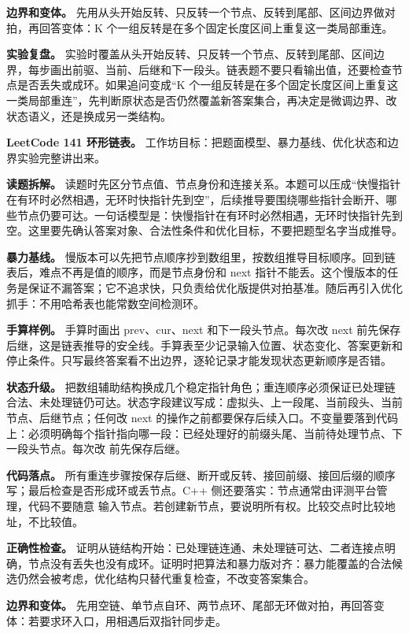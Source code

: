 \textbf{边界和变体。} 先用从头开始反转、只反转一个节点、反转到尾部、区间边界做对拍，再回答变体：K 个一组反转是在多个固定长度区间上重复这一类局部重连。

\textbf{实验复盘。} 实验时覆盖从头开始反转、只反转一个节点、反转到尾部、区间边界，每步画出前驱、当前、后继和下一段头。链表题不要只看输出值，还要检查节点是否丢失或成环。如果追问变成“K 个一组反转是在多个固定长度区间上重复这一类局部重连”，先判断原状态是否仍然覆盖新答案集合，再决定是微调边界、改状态语义，还是换成另一类结构。

\noindent\textbf{LeetCode 141 环形链表。} 工作坊目标：把题面模型、暴力基线、优化状态和边界实验完整讲出来。

\textbf{读题拆解。} 读题时先区分节点值、节点身份和连接关系。本题可以压成“快慢指针在有环时必然相遇，无环时快指针先到空”，后续推导要围绕哪些指针会断开、哪些节点仍要可达。一句话模型是：快慢指针在有环时必然相遇，无环时快指针先到空。这里要先确认答案对象、合法性条件和优化目标，不要把题型名字当成推导。

\textbf{暴力基线。} 慢版本可以先把节点顺序抄到数组里，按数组推导目标顺序。回到链表后，难点不再是值的顺序，而是节点身份和 next 指针不能丢。这个慢版本的任务是保证不漏答案；它不追求快，只负责给优化版提供对拍基准。随后再引入优化抓手：不用哈希表也能常数空间检测环。

\textbf{手算样例。} 手算时画出 prev、cur、next 和下一段头节点。每次改 next 前先保存后继，这是链表推导的安全线。手算表至少记录输入位置、状态变化、答案更新和停止条件。只写最终答案看不出边界，逐轮记录才能发现状态更新顺序是否错。

\textbf{状态升级。} 把数组辅助结构换成几个稳定指针角色；重连顺序必须保证已处理链合法、未处理链仍可达。状态字段建议写成：虚拟头、上一段尾、当前段头、当前节点、后继节点；任何改 next 的操作之前都要保存后续入口。不变量要落到代码上：必须明确每个指针指向哪一段：已经处理好的前缀头尾、当前待处理节点、下一段头节点。每次改  前先保存后继。

\textbf{代码落点。} 所有重连步骤按保存后继、断开或反转、接回前缀、接回后缀的顺序写；最后检查是否形成环或丢节点。C++ 侧还要落实：节点通常由评测平台管理，代码不要随意  输入节点。若创建新节点，要说明所有权。比较交点时比较地址，不比较值。

\textbf{正确性检查。} 证明从链结构开始：已处理链连通、未处理链可达、二者连接点明确，节点没有丢失也没有成环。证明时把算法和暴力版对齐：暴力能覆盖的合法候选仍然会被考虑，优化结构只替代重复检查，不改变答案集合。

\textbf{边界和变体。} 先用空链、单节点自环、两节点环、尾部无环做对拍，再回答变体：若要求环入口，用相遇后双指针同步走。

